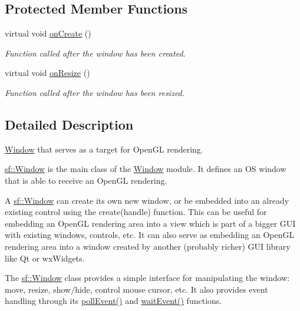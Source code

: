 \subsection*{Protected Member Functions}
\begin{DoxyCompactItemize}
\item 
virtual void \hyperlink{classsf_1_1_window_a106633b9be49b27f83d4712689b493eb}{on\+Create} ()
\begin{DoxyCompactList}\small\item\em Function called after the window has been created. \end{DoxyCompactList}\item 
virtual void \hyperlink{classsf_1_1_window_a10f567a387da7b49f417f73321fcf64d}{on\+Resize} ()
\begin{DoxyCompactList}\small\item\em Function called after the window has been resized. \end{DoxyCompactList}\end{DoxyCompactItemize}


\subsection{Detailed Description}
\hyperlink{classsf_1_1_window}{Window} that serves as a target for Open\+G\+L rendering. 

\hyperlink{classsf_1_1_window}{sf\+::\+Window} is the main class of the \hyperlink{classsf_1_1_window}{Window} module. It defines an O\+S window that is able to receive an Open\+G\+L rendering.

A \hyperlink{classsf_1_1_window}{sf\+::\+Window} can create its own new window, or be embedded into an already existing control using the create(handle) function. This can be useful for embedding an Open\+G\+L rendering area into a view which is part of a bigger G\+U\+I with existing windows, controls, etc. It can also serve as embedding an Open\+G\+L rendering area into a window created by another (probably richer) G\+U\+I library like Qt or wx\+Widgets.

The \hyperlink{classsf_1_1_window}{sf\+::\+Window} class provides a simple interface for manipulating the window\+: move, resize, show/hide, control mouse cursor, etc. It also provides event handling through its \hyperlink{classsf_1_1_window_a338e996585faf82e93069858e3b531b7}{poll\+Event()} and \hyperlink{classsf_1_1_window_aaf02ab64fbc1d374eef3696df54137bc}{wait\+Event()} functions.


